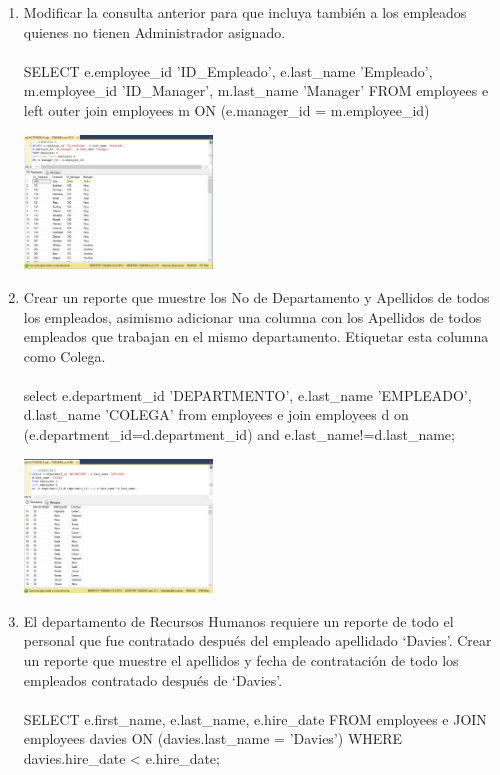 \begin{enumerate}[1.]
	\item Modificar la consulta anterior para que incluya tambi\'en a los empleados quienes no tienen Administrador asignado.
\\
\\SELECT e.employee\_id 'ID\_Empleado', e.last\_name 'Empleado', 
m.employee\_id 'ID\_Manager', m.last\_name 'Manager' 
FROM employees e 
left outer join employees m
ON (e.manager\_id = m.employee\_id)\\
	\begin{center}
	\includegraphics[width=5cm]{./Imagenes/8ejer5} 
	\end{center}

	\item Crear un reporte que muestre los No de Departamento y Apellidos de todos los empleados, asimismo adicionar una columna con los Apellidos de todos empleados que trabajan en el mismo departamento. Etiquetar esta columna como Colega.
\\
\\select e.department\_id 'DEPARTMENTO', e.last\_name 'EMPLEADO', 
d.last\_name 'COLEGA' 
from employees e 
join employees d 
on (e.department\_id=d.department\_id) and e.last\_name!=d.last\_name;\\

\begin{center}
	\includegraphics[width=5cm]{./Imagenes/8ejer6} 
	\end{center}

	\item El departamento de Recursos Humanos requiere un reporte de todo el personal que fue contratado después del empleado apellidado ‘Davies’. Crear un reporte que muestre el apellidos y fecha de contrataci\'on de todo los empleados contratado después de ‘Davies’.
\\
\\SELECT e.first\_name, e.last\_name, e.hire\_date 
FROM employees e 
JOIN employees davies 
ON (davies.last\_name = 'Davies') 
WHERE davies.hire\_date < e.hire\_date;\\


\end{enumerate}
